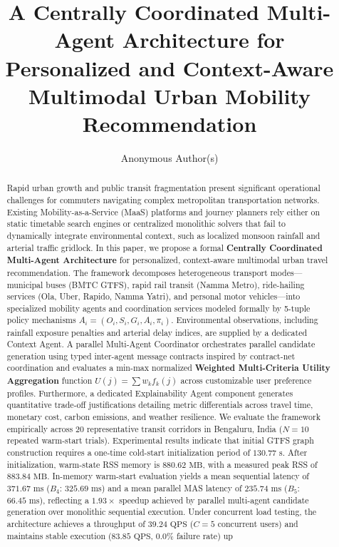 \documentclass[runningheads]{llncs}
\begin{document}
\title{A Centrally Coordinated Multi-Agent Architecture for Personalized and Context-Aware Multimodal Urban Mobility Recommendation}


\author{Anonymous Author(s)}

\maketitle

\begin{abstract}
Rapid urban growth and public transit fragmentation present significant operational challenges for commuters navigating complex metropolitan transportation networks. Existing Mobility-as-a-Service (MaaS) platforms and journey planners rely either on static timetable search engines or centralized monolithic solvers that fail to dynamically integrate environmental context, such as localized monsoon rainfall and arterial traffic gridlock. In this paper, we propose a formal \textbf{Centrally Coordinated Multi-Agent Architecture} for personalized, context-aware multimodal urban travel recommendation. The framework decomposes heterogeneous transport modes---municipal buses (BMTC GTFS), rapid rail transit (Namma Metro), ride-hailing services (Ola, Uber, Rapido, Namma Yatri), and personal motor vehicles---into specialized mobility agents and coordination services modeled formally by 5-tuple policy mechanisms $A_i = (O_i, S_i, G_i, A_i, \pi_i)$. Environmental observations, including rainfall exposure penalties and arterial delay indices, are supplied by a dedicated Context Agent. A parallel Multi-Agent Coordinator orchestrates parallel candidate generation using typed inter-agent message contracts inspired by contract-net coordination and evaluates a min-max normalized \textbf{Weighted Multi-Criteria Utility Aggregation} function $U(j) = \sum w_k f_k(j)$ across customizable user preference profiles. Furthermore, a dedicated Explainability Agent component generates quantitative trade-off justifications detailing metric differentials across travel time, monetary cost, carbon emissions, and weather resilience. We evaluate the framework empirically across 20 representative transit corridors in Bengaluru, India ($N=10$ repeated warm-start trials). Experimental results indicate that initial GTFS graph construction requires a one-time cold-start initialization period of $130.77\text{ s}$. After initialization, warm-state RSS memory is $880.62\text{ MB}$, with a measured peak RSS of $883.84\text{ MB}$. In-memory warm-start evaluation yields a mean sequential latency of $371.67\text{ ms}$ ($B_4$: $325.69\text{ ms}$) and a mean parallel MAS latency of $235.74\text{ ms}$ ($B_5$: $66.45\text{ ms}$), reflecting a $1.93\times$ speedup achieved by parallel multi-agent candidate generation over monolithic sequential execution. Under concurrent load testing, the architecture achieves a throughput of $39.24\text{ QPS}$ ($C=5$ concurrent users) and maintains stable execution ($83.85\text{ QPS}$, $0.0\%$ failure rate) up 
\end{abstract}
\end{document}
